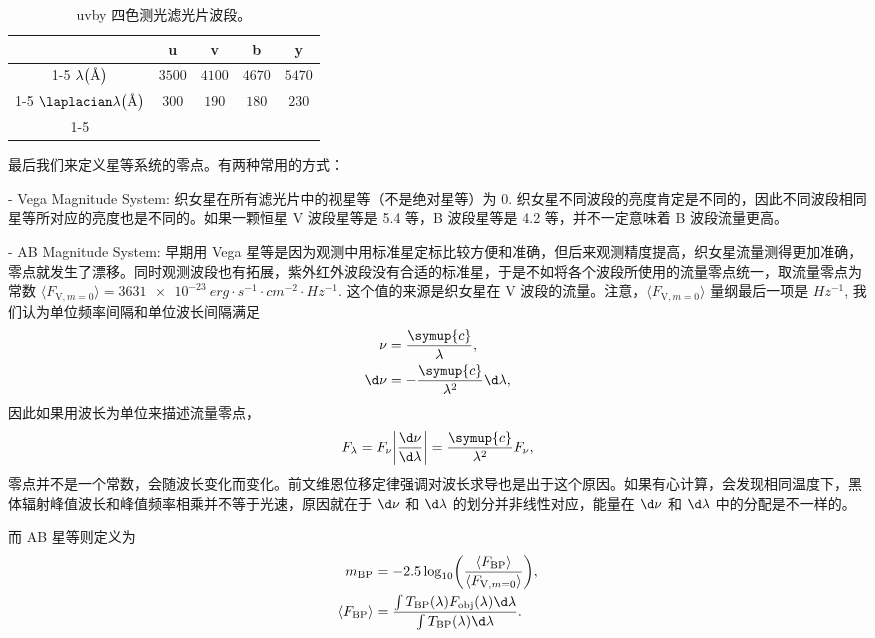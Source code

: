 \documentclass[../天体物理基础.tex]{subfiles}
\begin{document}
\begin{table}[htbp]
\centering
\caption{uvby 四色测光滤光片波段。}
\begin{tabular}{c c c c c}
\hline
 & u & v & b & y\\
\cline{1-5}
$\lambda\mleft(\unit{\angstrom}\mright)$ & $3500$ & $4100$ & $4670$ & $5470$\\
\cline{1-5}
$\laplacian\lambda\mleft(\unit{\angstrom}\mright)$ & $300$ & $190$ & $180$ & $230$\\
\cline{1-5}
\end{tabular}
\label{uvby 四色测光滤光片波段。}
\end{table}

最后我们来定义星等系统的零点。有两种常用的方式：

- Vega Magnitude System: 织女星在所有滤光片中的视星等（不是绝对星等）为 0. 织女星不同波段的亮度肯定是不同的，因此不同波段相同星等所对应的亮度也是不同的。如果一颗恒星 V 波段星等是 5.4 等，B 波段星等是 4.2 等，并不一定意味着 B 波段流量更高。

- AB Magnitude System: 早期用 Vega 星等是因为观测中用标准星定标比较方便和准确，但后来观测精度提高，织女星流量测得更加准确，零点就发生了漂移。同时观测波段也有拓展，紫外红外波段没有合适的标准星，于是不如将各个波段所使用的流量零点统一，取流量零点为常数 $\langle F_{\mathrm{V}, m=0}\rangle=\qty{3631e-23}{erg\cdot{}s^{-1}\cdot cm^{-2}\cdot Hz^{-1}}$. 这个值的来源是织女星在 V 波段的流量。注意，$\langle{}F_{\mathrm{V}, m=0}\rangle$ 量纲最后一项是 $\unit{Hz^{-1}}$, 我们认为单位频率间隔和单位波长间隔满足
\begin{align}
\nu&=\frac{\symup{c}}{\lambda},\\
\d\nu&=-\frac{\symup{c}}{\lambda^{2}}\d\lambda,
\end{align}
因此如果用波长为单位来描述流量零点，
\begin{align}
F_{\lambda}=F_{\nu}\mleft\vert\frac{\d\nu}{\d\lambda}\mright\vert{}=\frac{\symup{c}}{\lambda^{2}}F_{\nu},
\end{align}
零点并不是一个常数，会随波长变化而变化。前文维恩位移定律强调对波长求导也是出于这个原因。如果有心计算，会发现相同温度下，黑体辐射峰值波长和峰值频率相乘并不等于光速，原因就在于 $\d\nu$ 和 $\d\lambda$ 的划分并非线性对应，能量在 $\d\nu$ 和 $\d\lambda$ 中的分配是不一样的。

而 AB 星等则定义为
\begin{align}
m_{\mathrm{BP}}&=-2.5\log_{10}\mleft(\frac{\langle F_{\mathrm{BP}}\rangle}{\langle F_{\mathrm{V}, m=0}\rangle}\mright),\\
\langle F_{\mathrm{BP}}\rangle&=\frac{\int T_{\mathrm{BP}}\mleft(\lambda\mright) F_{\mathrm{obj}}\mleft(\lambda\mright)\d\lambda}{\int T_{\mathrm{BP}}\mleft(\lambda\mright)\d\lambda}.
\end{align}
\end{document}
